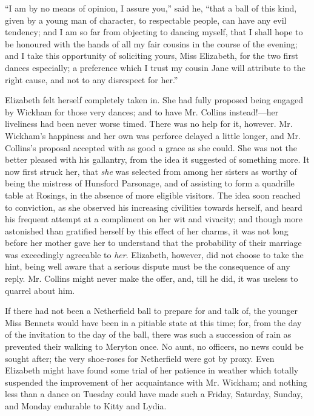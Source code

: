 \documentclass[12pt]{book}
\begin{document}
``I am by no means of opinion, I assure you,'' said he, ``that a ball of this kind, given by a young man of character, to respectable people, can have any evil tendency; and I am so far from objecting to dancing myself, that I shall hope to be honoured with the hands of all my fair cousins in the course of the evening; and I take this opportunity of soliciting yours, Miss Elizabeth, for the two first dances especially; a preference which I trust my cousin Jane will attribute to the right cause, and not to any disrespect for her.''

Elizabeth felt herself completely taken in. She had fully proposed being engaged by Wickham for those very dances; and to have Mr. Collins instead!---her liveliness had been never worse timed. There was no help for it, however. Mr. Wickham's happiness and her own was perforce delayed a little longer, and Mr. Collins's proposal accepted with as good a grace as she could. She was not the better pleased with his gallantry, from the idea it suggested of something more. It now first struck her, that \textit{she} was selected from among her sisters as worthy of being the mistress of Hunsford Parsonage, and of assisting to form a quadrille table at Rosings, in the absence of more eligible visitors. The idea soon reached to conviction, as she observed his increasing civilities towards herself, and heard his frequent attempt at a compliment on her wit and vivacity; and though more astonished than gratified herself by this effect of her charms, it was not long before her mother gave her to understand that the probability of their marriage was exceedingly agreeable to \textit{her}. Elizabeth, however, did not choose to take the hint, being well aware that a serious dispute must be the consequence of any reply. Mr. Collins might never make the offer, and, till he did, it was useless to quarrel about him.

If there had not been a Netherfield ball to prepare for and talk of, the younger Miss Bennets would have been in a pitiable state at this time; for, from the day of the invitation to the day of the ball, there was such a succession of rain as prevented their walking to Meryton once. No aunt, no officers, no news could be sought after; the very shoe-roses for Netherfield were got by proxy. Even Elizabeth might have found some trial of her patience in weather which totally suspended the improvement of her acquaintance with Mr. Wickham; and nothing less than a dance on Tuesday could have made such a Friday, Saturday, Sunday, and Monday endurable to Kitty and Lydia.
\end{document}

